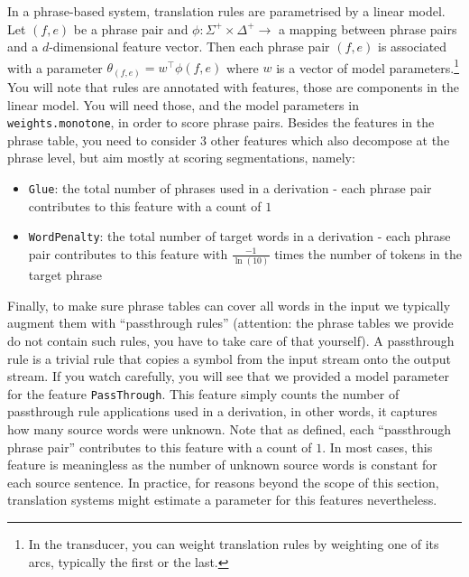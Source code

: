 In a phrase-based system, translation rules are parametrised by a linear model.
Let $(f, e)$ be a phrase pair and $\phi: \Sigma^+ \times \Delta^+ \to$ a mapping between phrase pairs and a $d$-dimensional feature vector.
Then each phrase pair $(f,e)$ is associated with a parameter $\theta_{(f,e)} = w^\top \phi(f,e)$ where $w$ is a vector of model parameters.\footnote{In the transducer, you can weight translation rules by weighting one of its arcs, typically the first or the last.}
You will note that rules are annotated with features, those are components in the linear model. You will need those, and the model parameters in \texttt{weights.monotone}, in order to score phrase pairs. 
Besides the features in the phrase table, you need to consider 3 other features which also decompose at the phrase level, but aim mostly at scoring segmentations, namely:
\begin{itemize}
	\item \texttt{Glue}: the total number of phrases used in a derivation - each phrase pair contributes to this feature with a count of $1$
	\item \texttt{WordPenalty}: the total number of target words in a derivation - each phrase pair contributes to this feature with $\frac{-1}{\ln(10)}$ times the number of tokens in the target phrase 
\end{itemize}

Finally, to make sure phrase tables can cover all words in the input we typically augment them with ``passthrough rules'' (attention: the phrase tables we provide do not contain such rules, you have to take care of that yourself).
A passthrough rule is a trivial rule that copies a symbol from the input stream onto the output stream. 
If you watch carefully, you will see that we provided a model parameter for the feature \texttt{PassThrough}.
This feature simply counts the number of passthrough rule applications used in a derivation, in other words, it captures how many source words were unknown. 
Note that as defined, each ``passthrough phrase pair'' contributes to this feature with a count of $1$.
In most cases, this feature is meaningless as the number of unknown source words is constant for each source sentence. 
In practice, for reasons beyond the scope of this section, translation systems might estimate a parameter for this features nevertheless.



